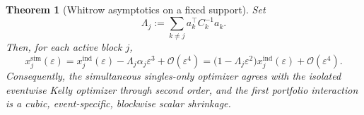 \documentclass[11pt]{article}
\numberwithin{equation}{section}
\newtheorem{theorem}{Theorem}[section]
\theoremstyle{remark}
\theoremstyle{definition}
\newcommand{\1}{\mathbf{1}}
\newcommand{\OO}{\mathcal{O}}
\newcommand{\eps}{\varepsilon}
\newcommand{\ind}{\mathrm{ind}}
\newcommand{\simu}{\mathrm{sim}}
\begin{document}
\begin{theorem}[Whitrow asymptotics on a fixed support]
\label{thm:whitrow}
Set
\begin{equation}
  \Lambda_j:=\sum_{k\ne j} a_k^\top C_k^{-1}a_k.
  \label{eq:Lambda}
\end{equation}
Then, for each active block $j$,
\begin{equation}
  x_j^{\simu}(\eps)
  =x_j^{\ind}(\eps)-\Lambda_j\alpha_j\eps^3+\OO(\eps^4)
  =\bigl(1-\Lambda_j\eps^2\bigr)x_j^{\ind}(\eps)+\OO(\eps^4).
  \label{eq:whitrow-main}
\end{equation}
Consequently, the simultaneous singles-only optimizer agrees with the isolated eventwise Kelly optimizer through second order, and the first portfolio interaction is a cubic, event-specific, blockwise scalar shrinkage.
\end{theorem}
\end{document}
